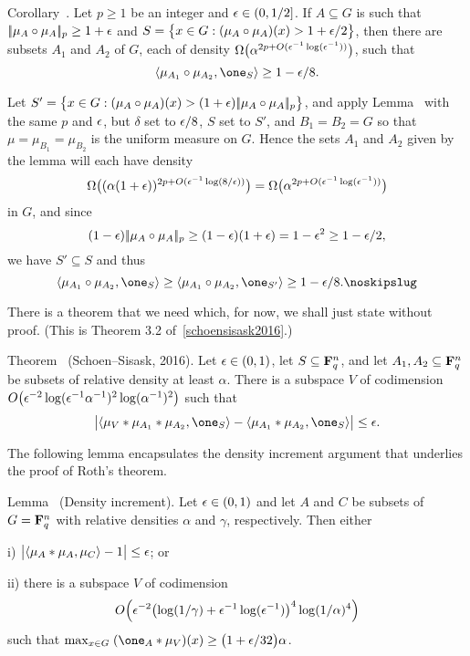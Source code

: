 \edef\deprandcorollary{\the\thmcount}
\proclaim Corollary~{\advthm}. Let $p\ge 1$ be an integer and $\epsilon\in (0,1/2]$. If $A\subseteq G$ is such that
$|\!|\mu_A\circ\mu_A|\!|_p \ge 1+\epsilon$ and
$S = \bigl\{x\in G: (\mu_A\circ\mu_A)(x) > 1+\epsilon/2\bigr\}$, then there are
subsets $A_1$ and $A_2$ of $G$, each of density $\Omega\bigl( \alpha^{2p+O(\epsilon^{-1}\log(\epsilon^{-1}))}\bigr)$,
such that
$$\langle \mu_{A_1}\circ\mu_{A_2}, \one_S\rangle \ge 1-\eps/8.$$

\proof Let $S' = \bigl\{x\in G : (\mu_A\circ\mu_A)(x) > (1+\epsilon)|\!|\mu_A\circ\mu_A|\!|_p\bigr\}$, and apply
Lemma~{\dependentrandom} with the same $p$ and $\epsilon$, but $\delta$ set to $\epsilon/8$, $S$ set to $S'$,
and $B_1 = B_2 = G$ so that $\mu = \mu_{B_1} = \mu_{B_2}$ is the uniform measure on $G$. Hence the
sets $A_1$ and $A_2$ given by the lemma will each have density
$$\Omega\bigl((\alpha(1+\epsilon))^{2p+O(\epsilon^{-1}\log(8/\epsilon))}\bigr)
=\Omega\bigl(\alpha^{2p+O(\epsilon^{-1}\log(\epsilon^{-1}))}\bigr)$$
in $G$, and since
$$(1-\epsilon)|\!|\mu_A\circ\mu_A|\!|_p \ge (1-\epsilon)(1+\epsilon) = 1-\epsilon^2 \ge 1-\epsilon/2,$$
we have $S'\subseteq S$ and thus
$$\langle \mu_{A_1}\circ\mu_{A_2}, \one_S\rangle \ge
\langle \mu_{A_1}\circ\mu_{A_2}, \one_{S'}\rangle \ge 1-\eps/8.\noskipslug$$

There is a theorem that we need which, for now, we shall just state without proof. (This is Theorem 3.2
of~\ref{schoensisask2016}.)

\edef\almostperiodicity{\the\thmcount}
\parenproclaim Theorem~{\advthm} (Schoen--Sisask, {\rm 2016}).
Let $\epsilon\in (0,1)$, let $S\subseteq {\bf F}_q^n$, and
let $A_1,A_2\subseteq {\bf F}_q^n$ be subsets
of relative density at least $\alpha$. There is a subspace $V$ of codimension
$O\bigl(\epsilon^{-2}\log(\epsilon^{-1}\alpha^{-1})^2\log(\alpha^{-1})^2\bigr)$
such that
$$\bigl| \langle \mu_V*\mu_{A_1}*\mu_{A_2}, \one_S\rangle -
 \langle \mu_{A_1}*\mu_{A_2}, \one_S\rangle\bigr| \le \eps.$$

The following lemma encapsulates the density increment argument that underlies the proof of Roth's theorem.

\edef\densityincrement{\the\thmcount}
\parenproclaim Lemma~{\advthm} (Density increment). Let $\epsilon\in (0,1)$ and let $A$ and $C$
be subsets of $G ={\bf F}_q^n$ with relative densities $\alpha$ and $\gamma$, respectively. Then either
\medskip
\item{i)} $\bigl|\langle \mu_A*\mu_A,\mu_C\rangle-1\bigr| \le \epsilon$; or
\smallskip
\item{ii)} there is a subspace $V$ of codimension
$$O\Bigl(\epsilon^{-2}\bigl(\log(1/\gamma)+\epsilon^{-1}\log(\epsilon^{-1})\bigr)^4\log(1/\alpha)^4\Bigr)$$
such that $\max_{x\in G}\;(\one_A*\mu_V)(x) \ge \bigl(1+\eps/32\bigr)\alpha$.
\medskip

